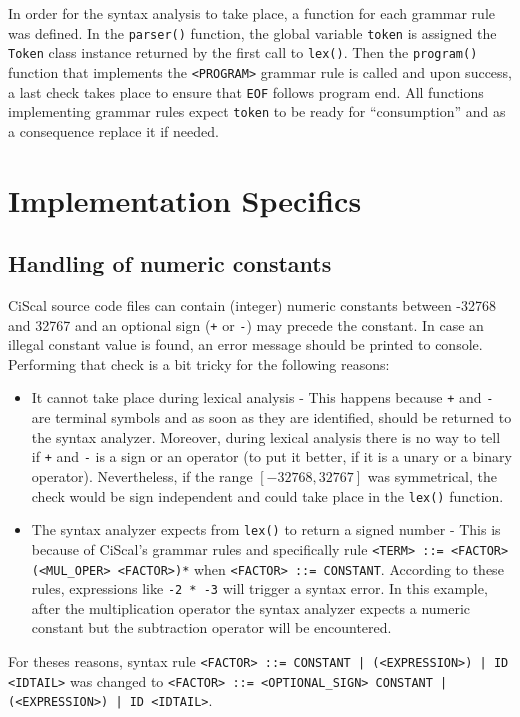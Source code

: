 \documentclass{article}
\def\code#1{\texttt{#1}} %
\begin{document}
In order for the syntax analysis to take place, a function for each grammar rule was defined. 
In the \code{parser()} function, the global variable \code{token} is assigned the
\code{Token} class instance returned by the first call to \code{lex()}. Then the \code{program()}
function that implements the \code{<PROGRAM>} grammar rule is called and upon success, a last
check takes place to ensure that \code{EOF} follows program end. All functions implementing
grammar rules expect \code{token} to be ready for ``consumption'' and as a consequence 
replace it if needed.

\section{Implementation Specifics}
\subsection{Handling of numeric constants}
CiScal source code files can contain (integer) numeric constants between -32768 and 32767 and
an optional sign (\code{+} or \code{-}) may precede the constant. In case an illegal constant
value is found, an error message should be printed to console. Performing that
check is a bit tricky for the following reasons:
\begin{itemize}
 \item It cannot take place during lexical analysis - This happens because \code{+} and \code{-}
       are terminal symbols and as soon as they are identified, should be returned to the syntax
       analyzer. Moreover, during lexical analysis there is no way to tell if \code{+} and \code{-}
       is a sign or an operator (to put it better, if it is a unary or a binary operator).
       Nevertheless, if the range $[-32768, 32767]$ was symmetrical, the check would be sign
       independent and could take place in the \code{lex()} function.
 \item The syntax analyzer expects from \code{lex()} to return a signed number - This is because
       of CiScal's grammar rules and specifically rule \code{<TERM> ::= <FACTOR> (<MUL\_OPER> <FACTOR>)*}
       when \code{<FACTOR> ::= CONSTANT}. According to these rules, expressions like \code{-2 * -3}
       will trigger a syntax error. In this example, after the multiplication operator the syntax
       analyzer expects a numeric constant but the subtraction operator will be encountered.
\end{itemize}

For theses reasons, syntax rule \code{<FACTOR> ::= CONSTANT | (<EXPRESSION>) | ID <IDTAIL>} was
changed to \code{<FACTOR> ::= <OPTIONAL\_SIGN> CONSTANT | (<EXPRESSION>) | ID <IDTAIL>}.
\end{document}
